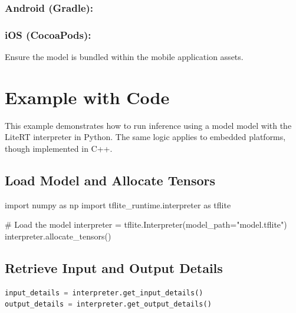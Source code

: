 \subsubsection{Android (Gradle):}


\bigskip


\subsubsection{iOS (CocoaPods):}






Ensure the model   is bundled within the mobile application assets.



\section{Example with Code}



This example demonstrates how to run inference using a model  model with the LiteRT interpreter in Python. The same logic applies to embedded platforms, though implemented in C++.



\subsection{Load Model and Allocate Tensors}



{   
  \begin{Python}
import numpy as np
import tflite_runtime.interpreter as tflite

# Load the model
interpreter = tflite.Interpreter(model_path="model.tflite")
interpreter.allocate_tensors()
  \end{Python}
}


\subsection{Retrieve Input and Output Details}



\begin{lstlisting}[language=Python, caption={Retrieving tensor details}]
input_details = interpreter.get_input_details()
output_details = interpreter.get_output_details()
\end{lstlisting}



